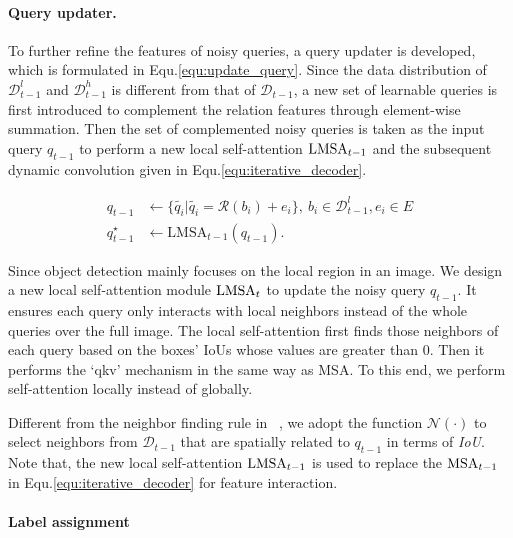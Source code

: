 \documentclass[final]{cvpr}
\begin{document}
\paragraph{Query updater.}
\label{para:query_updater}
To further refine the features of noisy queries, a query updater is developed, which is formulated in Equ.\eqref{equ:update_query}. Since the data distribution of $\mathcal{D}^{l}_{t-1}$ and $\mathcal{D}^{h}_{t-1}$ is different from that of $\mathcal{D}_{t-1}$, a new set of learnable queries is first introduced to complement the relation features through element-wise summation. Then the set of complemented noisy queries is taken as the input query $q_{t-1}$ to perform a new local self-attention ${\rm LMSA}_{t-1}$ and the subsequent dynamic convolution given in Equ.\eqref{equ:iterative_decoder}.


\begin{equation}
\begin{split}
        q_{t-1} &\gets \{\widetilde{q_i}|\widetilde{q_i}=\mathcal{R}(b_i) + e_i\}, \ b_i \in \mathcal{D}^l_{t-1}, e_i \in E  \\
        q^{\star}_{t-1} &\gets \text{LMSA}_{t-1}(q_{t-1}).
\end{split}\label{equ:update_query}
\end{equation}

Since object detection mainly focuses on the local region in an image. We design a new local self-attention module  ${\rm LMSA}_t$ to update the noisy query $q_{t-1}$.  It ensures each query only interacts with local neighbors instead of the whole queries over the full image. The local self-attention first finds those neighbors of each query based on the boxes' IoUs whose values are greater than 0. Then it performs the `qkv' mechanism in the same way as MSA. To this end, we perform self-attention locally instead of globally.

Different from the neighbor finding rule in ~\cite{lin2020detr}, we adopt the function $\mathcal{N}(\cdot)$ to select neighbors from $\mathcal{D}_{t-1}$ that are spatially related to $q_{t-1}$ in terms of \textit{IoU}. Note that, the new local self-attention ${\rm LMSA}_{t-1}$ is used to replace the ${\rm MSA}_{t-1}$ in Equ.\eqref{equ:iterative_decoder} for feature interaction.

\vspace{-0.5cm}
\paragraph{Label assignment}
\end{document}
